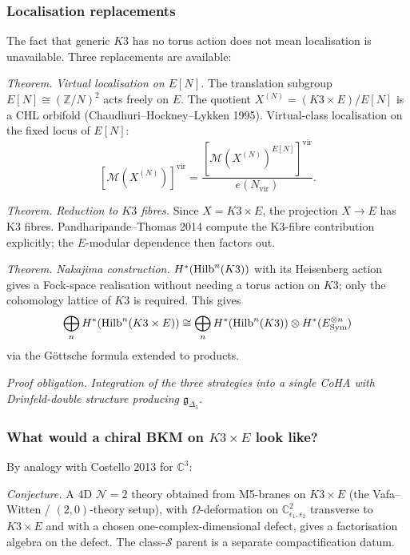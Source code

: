 \subsubsection{Localisation replacements}

The fact that generic $K3$ has no torus action does not mean localisation is
unavailable. Three replacements are available:

\emph{Theorem.} \emph{Virtual localisation on $E[N]$.}
The translation subgroup $E[N] \cong (\mathbb{Z}/N)^2$ acts freely on $E$. The
quotient $X^{(N)} = (K3 \times E)/E[N]$ is a CHL orbifold (Chaudhuri--Hockney--Lykken
1995). Virtual-class localisation on the fixed locus of $E[N]$:
\[
[\mathcal{M}(X^{(N)})]^{\mathrm{vir}} = \frac{[\mathcal{M}(X^{(N)})^{E[N]}]^{\mathrm{vir}}}{e(N_{\mathrm{vir}})}.
\]

\emph{Theorem.} \emph{Reduction to $K3$ fibres.}
Since $X = K3 \times E$, the projection $X \to E$ has K3 fibres. Pandharipande--Thomas 2014
compute the K3-fibre contribution explicitly; the $E$-modular dependence then
factors out.

\emph{Theorem.} \emph{Nakajima construction.}
$H^*(\mathrm{Hilb}^n(K3))$ with its Heisenberg action gives a Fock-space realisation without
needing a torus action on $K3$; only the cohomology lattice of $K3$ is required.
This gives
\[
\bigoplus_n H^*(\mathrm{Hilb}^n(K3 \times E)) \cong \bigoplus_n H^*(\mathrm{Hilb}^n(K3)) \otimes H^*(E^{\otimes n}_{\text{Sym}})
\]
via the Göttsche formula extended to products.

\emph{Proof obligation.} \emph{Integration of the three strategies into a single CoHA with
Drinfeld-double structure producing $\mathfrak{g}_{\Delta_5}$.}

\subsubsection{What would a chiral BKM on $K3 \times E$ look like?}

By analogy with Costello 2013 for $\mathbb{C}^3$:

\emph{Conjecture.} A 4D $\mathcal{N}=2$ theory obtained from M5-branes on
$K3 \times E$ (the Vafa--Witten / $(2,0)$-theory setup), with
$\Omega$-deformation on $\mathbb{C}^2_{\epsilon_1,\epsilon_2}$ transverse
to $K3 \times E$ and with a chosen one-complex-dimensional defect, gives
a factorisation algebra on the defect.  The class-$\mathcal S$ parent is
a separate compactification datum.

